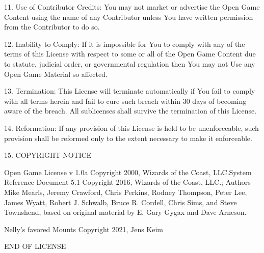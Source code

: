 \documentclass[letterpaper,twocolumn,openany,nodeprecatedcode]{dndbook}
\begin{document}
11. Use of Contributor Credits: You may not market or advertise the Open Game Content using the name of any Contributor unless You have written permission from the Contributor to do so.

12. Inability to Comply: If it is impossible for You to comply with any of the terms of this License with respect to some or all of the Open Game Content due to statute, judicial order, or governmental regulation then You may not Use any Open Game Material so affected.

13. Termination: This License will terminate automatically if You fail to comply with all terms herein and fail to cure such breach within 30 days of becoming aware of the breach. All sublicenses shall survive the termination of this License.

14. Reformation: If any provision of this License is held to be unenforceable, such provision shall be reformed only to the extent necessary to make it enforceable.

15. COPYRIGHT NOTICE

    Open Game License v 1.0a Copyright 2000, Wizards of the Coast, LLC.System Reference Document 5.1 Copyright 2016, Wizards of the Coast, LLC.; Authors Mike Mearls, Jeremy Crawford, Chris Perkins, Rodney Thompson, Peter Lee, James Wyatt, Robert J. Schwalb, Bruce R. Cordell, Chris Sims, and Steve Townshend, based on original material by E. Gary Gygax and Dave Arneson.

    Nelly's favored Mounts Copyright 2021, Jens Keim

END OF LICENSE
\end{document}
